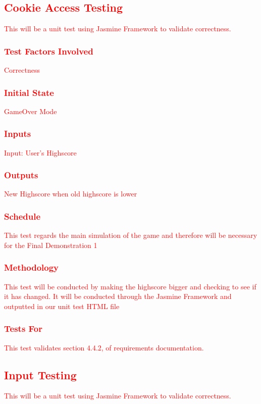 \documentclass[11pt, oneside]{article}   	%
\begin{document}
\subsection{\textcolor{red}{Cookie Access Testing}}
\textcolor{red}{This will be a unit test using Jasmine Framework to validate correctness.}
\subsubsection{\textcolor{red}{Test Factors Involved}}
\textcolor{red}{Correctness}
\subsubsection{\textcolor{red}{Initial State}}
\textcolor{red}{GameOver Mode}
\subsubsection{\textcolor{red}{Inputs}}
\textcolor{red}{Input: User's Highscore}
\subsubsection{\textcolor{red}{Outputs}}
\textcolor{red}{New Highscore when old highscore is lower}
\subsubsection{\textcolor{red}{Schedule}}
\textcolor{red}{This test regards the main simulation of the game and therefore will be necessary for the Final Demonstration 1}
\subsubsection{\textcolor{red}{Methodology}}
\textcolor{red}{This test will be conducted by making the highscore bigger and checking to see if it has changed. It will be conducted through the Jasmine Framework and outputted in our unit test HTML file}
\subsubsection{\textcolor{red}{Tests For}}
\textcolor{red}{This test validates section 4.4.2, of requirements documentation.}


\subsection{\textcolor{red}{Input Testing}}
\textcolor{red}{This will be a unit test using Jasmine Framework to validate correctness.}
\end{document}
